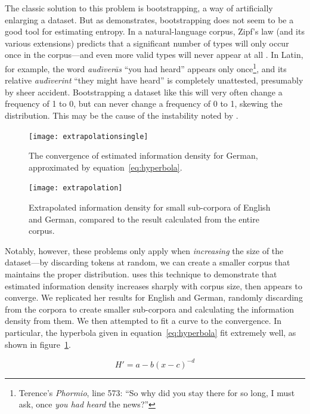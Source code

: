 \documentclass[12pt,twoside]{article}
\begin{document}
The classic solution to this problem is bootstrapping, a way of artificially enlarging a dataset. But as \citet[55-56]{oh} demonstrates, bootstrapping does not seem to be a good tool for estimating entropy. In a natural-language corpus, Zipf's law (and its various extensions) predicts that a significant number of types will only occur once in the corpus---and even more valid types will never appear at all \citep{davis}. In Latin, for example, the word \emph{aud\=\i{}ver\=as} ``you had heard'' appears only once\footnote{Terence's \emph{Phormio}, line 573: ``So why did you stay there for so long, I must ask, once \emph{you had heard} the news?''}, and its relative \emph{aud\=\i{}verint} ``they might have heard'' is completely unattested, presumably by sheer accident. Bootstrapping a dataset like this will very often change a frequency of 1 to 0, but can never change a frequency of 0 to 1, skewing the distribution. This may be the cause of the instability noted by \citet[56]{oh}.

\begin{figure}[h]
\centering
\noindent\texttt{[image: extrapolationsingle]}
\caption{The convergence of estimated information density for German, approximated by equation~\ref{eq:hyperbola}.}
\label{fig:exsingle}
\end{figure}

\begin{figure}[h]
\centering
\noindent\texttt{[image: extrapolation]}
\caption{Extrapolated information density for small sub-corpora of English and German, compared to the result calculated from the entire corpus.}
\label{fig:exdouble}
\end{figure}

Notably, however, these problems only apply when \emph{increasing} the size of the dataset---by discarding tokens at random, we can create a smaller corpus that maintains the proper distribution. \citet[57]{oh} uses this technique to demonstrate that estimated information density increases sharply with corpus size, then appears to converge. We replicated her results for English and German, randomly discarding from the corpora to create smaller sub-corpora and calculating the information density from them. We then attempted to fit a curve to the convergence. In particular, the hyperbola given in equation~\ref{eq:hyperbola} fit extremely well, as shown in figure~\ref{fig:exsingle}.

\begin{equation}
\label{eq:hyperbola}
H' = a-b(x-c)^{-d}
\end{equation}
\end{document}
